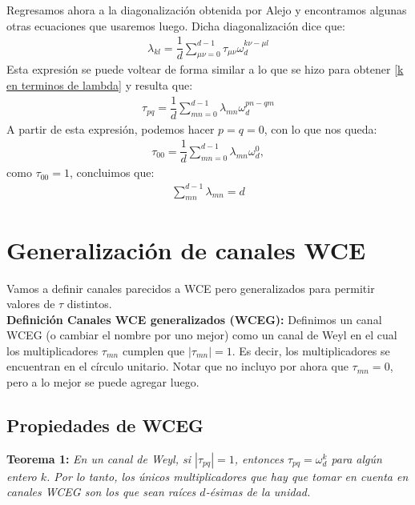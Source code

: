 Regresamos ahora a la diagonalización obtenida por Alejo  y encontramos algunas otras ecuaciones que usaremos luego. Dicha diagonalización dice que:
\begin{align*}
\lambda_{kl} = \dfrac{1}{d} \sum_{\mu \nu = 0}^{d-1} \tau_{\mu \nu} \omega_d^{k \nu - \mu l}
\end{align*}
Esta expresión se puede voltear de forma similar a lo que se hizo para obtener \ref{k en terminos de lambda} y resulta que:
\begin{align}
\label{tau en termino de lambda}
\tau_{pq} = \dfrac{1}{d} \sum_{mn=0}^{d-1} \lambda_{mn} \omega_d^{pn-qm}
\end{align}
A partir de esta expresión, podemos hacer $p=q=0$, con lo que nos queda:
\begin{align*}
\tau_{00} = \dfrac{1}{d} \sum_{mn=0}^{d-1} \lambda_{mn} \omega_d^0,
\end{align*}
como $\tau_{00}=1$, concluimos que:
\begin{align}
\label{suma-lambdas}
\sum_{mn}^{d-1}\lambda_{mn} = d
\end{align}

\section{Generalización de canales WCE}

Vamos a definir canales parecidos a WCE pero generalizados para permitir valores de $\tau$ distintos. \\

\textbf{Definición Canales WCE generalizados (WCEG):} Definimos un canal WCEG (o cambiar el nombre por uno mejor) como un canal de Weyl en el cual los multiplicadores $\tau_{mn}$ cumplen que $|\tau_{mn}|= 1$.  Es decir, los multiplicadores se encuentran en el círculo unitario. Notar que no incluyo por ahora que $\tau_{mn} = 0$, pero a lo mejor se puede agregar luego. \\





\subsection{Propiedades de WCEG}



\textbf{Teorema 1:} \textit{En un canal de Weyl, si $|\tau_{pq}| = 1$, entonces $\tau_{pq} = \omega_d^{k}$ para algún entero $k$. Por lo tanto, los únicos multiplicadores que hay que tomar en cuenta en canales WCEG son los que sean raíces $d$-ésimas de la unidad.} \\

